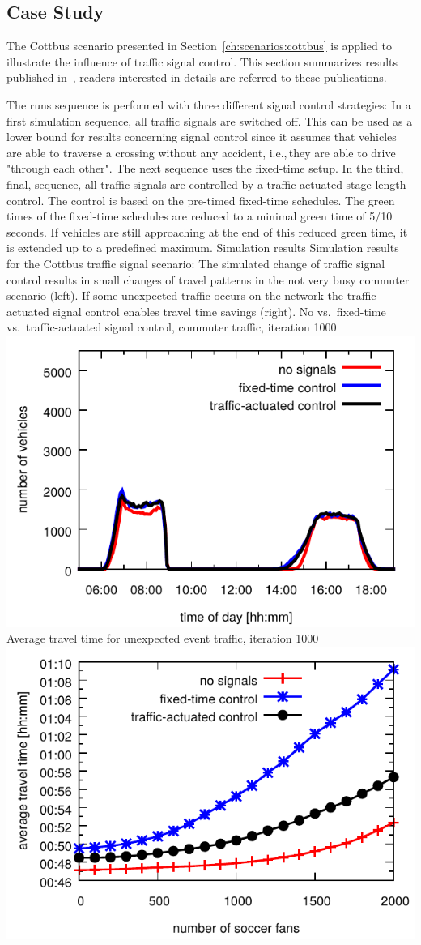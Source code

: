 \subsection{Case Study}
The Cottbus scenario presented in Section~\ref{ch:scenarios:cottbus} is applied to illustrate the influence of traffic signal control. 
This section summarizes results published in~\citet{GretherBischoffNagel2011CottbusSylviaEventAbstract,Grether2014PhD}, readers interested in details are referred to these publications. 

The runs sequence is performed with three different signal control strategies:
In a first simulation sequence, all traffic signals are switched off. This can be used as a lower bound for results concerning signal control since it assumes that vehicles are able to traverse a crossing without any accident, i.e.,\,they are able to drive "through each other". 
The next sequence uses the fixed-time setup. 
In the third, final, sequence, all traffic signals are controlled by a traffic-actuated stage length control. 
The control is based on the pre-timed fixed-time schedules. 
The green times of the fixed-time schedules are reduced to a minimal green time of 5/10\,seconds. 
If vehicles are still approaching at the end of this reduced green time, it is extended up to a predefined maximum. 
%
\createfigure%
{Simulation results}%
{Simulation results for the Cottbus traffic signal scenario: The simulated change of traffic signal control results in small changes of travel patterns in the not very busy commuter scenario (left). If some unexpected traffic occurs on the network the traffic-actuated signal control enables travel time savings (right).}%
{\label{fig:results_histogram}}
{%
  \createsubfigure%
  {No vs.~fixed-time vs.~traffic-actuated signal control, commuter traffic, iteration 1000}%
	{\includegraphics[width=0.48\linewidth]{extending/figures/signalslanes/leg_histogram_cottbus_1292_1293_1291_it_1000_book.pdf}}
  {\label{fig:commuter_traffic}}%
  \createsubfigure%
	{Average travel time for unexpected event traffic, iteration 1000}
	{\includegraphics[width=0.48\linewidth]{extending/figures/signalslanes/average_travel_time_1220_1222_book.pdf}}
	{\label{fig:unexpected_event}}
}%
{\citet{Grether2014PhD}}

